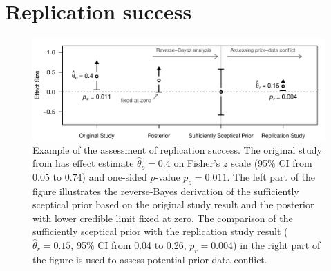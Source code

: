 \section{Replication success}\label{sec2:RS}

\begin{center}
\begin{figure}[!h]
\begin{center}
\begin{knitrout}
\color{fgcolor}

{\centering \includegraphics[width=\maxwidth]{images/paper2/fig1-1}

}

\end{knitrout}
\caption{Example of the assessment of replication success. The original study
  from \citet{Pyc2010} has effect estimate $\hat \theta_o= 0.4$ on Fisher's $z$
  scale (95\% CI from $0.05$ to $0.74$) and one-sided $p$-value $p_o = 0.011$.
  The left part of the figure illustrates the reverse-Bayes derivation of the
  sufficiently sceptical prior based on the original study result and the
  posterior with lower credible limit fixed at zero. The comparison of the
  sufficiently sceptical prior with the replication study result
  ($\hat \theta_r = 0.15$, 95\% CI from 0.04 to 0.26, $p_r = 0.004$) in the
  right part of the figure is used to assess potential prior-data conflict.}
  \label{fig2:fig1}
\end{center}
\end{figure}
\end{center}



